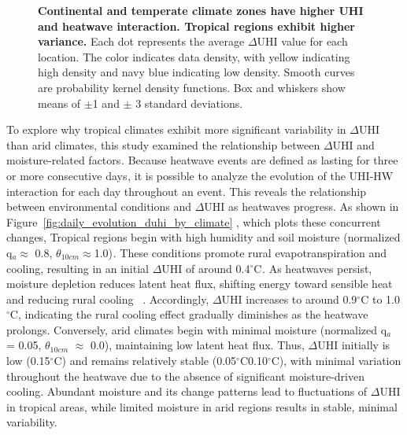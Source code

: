 \bgroup
{}
\begin{figure*}[!htbp]
\centering \makeatletter{}
\makeatother 
\caption{{\textbf{Continental and temperate climate zones have higher UHI and heatwave interaction. Tropical regions exhibit higher variance. }Each dot represents the average \ensuremath{\Delta }UHI value for each location. The color indicates data density, with yellow indicating high density and navy blue indicating low density. Smooth curves are probability kernel density functions. Box and whiskers show means of \ensuremath{\pm}1 and \ensuremath{\pm} 3 standard deviations.}}
\label{fig:duhi_variance_by_climate_zone}
\end{figure*}
\egroup
To explore why tropical climates exhibit more significant variability in \ensuremath{\Delta }UHI than arid climates, this study examined the relationship between \ensuremath{\Delta }UHI and moisture-related factors\ensuremath{^{}}. Because heatwave events are defined as lasting for three or more consecutive days\ensuremath{^{}}, it is possible to analyze the evolution of the UHI-HW interaction for each day throughout an event. This reveals the relationship between environmental conditions and \ensuremath{\Delta }UHI as heatwaves progress. As shown in Figure~\ref{fig:daily_evolution_duhi_by_climate} , which plots these concurrent changes, Tropical regions begin with high humidity and soil moisture (normalized q\ensuremath{_{a}}\ensuremath{\approx } 0.8, \ensuremath{\theta }\ensuremath{_{10cm}}\noindent \ensuremath{\approx }1.0)\ensuremath{^{}}. These conditions promote rural evapotranspiration and cooling, resulting in an initial \ensuremath{\Delta }UHI of around 0.4\ensuremath{^\circ}C\ensuremath{^{}}. As heatwaves persist, moisture depletion reduces latent heat flux, shifting energy toward sensible heat and reducing rural cooling\unskip~\cite{2755510:33598930,2755510:33598950,2755510:33598927} . Accordingly, \ensuremath{\Delta }UHI increases to around  0.9\ensuremath{^\circ}C to 1.0\ensuremath{^\circ}C, indicating the rural cooling effect gradually diminishes as the heatwave prolongs. Conversely, arid climates begin with minimal moisture (normalized q\ensuremath{_{a}} = 0.05, \ensuremath{\theta }\ensuremath{_{10cm}} \ensuremath{\approx } 0.0), maintaining low latent heat flux. Thus, \ensuremath{\Delta }UHI initially is low ({\texttildeapprox}0.15\ensuremath{^\circ}C) and remains relatively stable (0.05\ensuremath{^\circ}C{\textendash}0.10\ensuremath{^\circ}C), with minimal variation throughout the heatwave due to the absence of significant moisture-driven cooling.  Abundant moisture and its change patterns lead to fluctuations of \ensuremath{\Delta }UHI in tropical areas, while limited moisture in arid regions results in stable, minimal variability.


